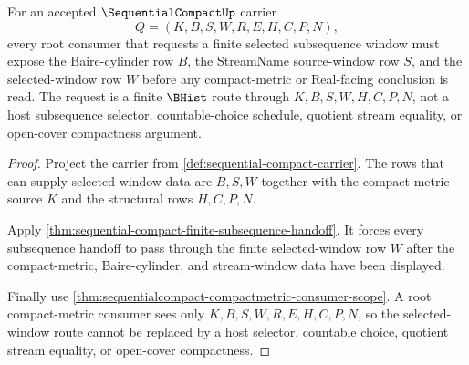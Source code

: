 \begin{theorem}
\label{thm:sequential-compact-root-window}
For an accepted $\SequentialCompactUp$ carrier
$$
Q=(K,B,S,W,R,E,H,C,P,N),
$$
every root consumer that requests a finite selected subsequence window must expose the Baire-cylinder row $B$, the StreamName source-window row $S$, and the selected-window row $W$ before any compact-metric or Real-facing conclusion is read. The request is a finite $\BHist$ route through $K,B,S,W,H,C,P,N$, not a host subsequence selector, countable-choice schedule, quotient stream equality, or open-cover compactness argument.
\end{theorem}
\begin{proof}
Project the carrier from \autoref{def:sequential-compact-carrier}. The rows that can supply selected-window data are $B,S,W$ together with the compact-metric source $K$ and the structural rows $H,C,P,N$.

Apply \autoref{thm:sequential-compact-finite-subsequence-handoff}. It forces every subsequence handoff to pass through the finite selected-window row $W$ after the compact-metric, Baire-cylinder, and stream-window data have been displayed.

Finally use \autoref{thm:sequentialcompact-compactmetric-consumer-scope}. A root compact-metric consumer sees only $K,B,S,W,R,E,H,C,P,N$, so the selected-window route cannot be replaced by a host selector, countable choice, quotient stream equality, or open-cover compactness.
\end{proof}

